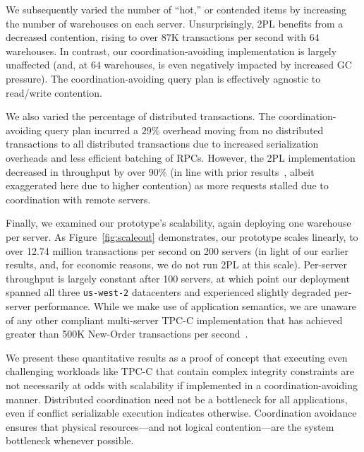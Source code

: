  We subsequently varied the number of
``hot,'' or contended items by increasing the number of warehouses on
each server. Unsurprisingly, 2PL benefits from a decreased
contention, rising to over $87$K transactions per second with $64$
warehouses. In contrast, our coordination-avoiding implementation is
largely unaffected (and, at $64$ warehouses, is even negatively
impacted by increased GC pressure). The coordination-avoiding query
plan is effectively agnostic to read/write contention.

 We also varied the percentage of
distributed transactions. The coordination-avoiding query plan
incurred a $29\%$ overhead moving from no distributed transactions to
all distributed transactions due to increased serialization overheads
and less efficient batching of RPCs. However, the 2PL implementation decreased in throughput by over $90\%$ (in line
with prior results~\cite{abadi-vll,calvin}, albeit exaggerated here
due to higher contention) as more requests stalled due to coordination
with remote servers.

 Finally, we examined our prototype's scalability,
again deploying one warehouse per server. As Figure~\ref{fig:scaleout}
demonstrates, our prototype scales linearly, to over 12.74 million
transactions per second on 200 servers (in light of our earlier
results, and, for economic reasons, we do not run 2PL at this
scale). Per-server throughput is largely constant after 100 servers,
at which point our deployment spanned all three \texttt{us-west-2}
datacenters and experienced slightly degraded per-server performance.
While we make use of application semantics, we are unaware of
any other compliant multi-server TPC-C implementation that has
achieved greater than 500K New-Order transactions per
second~\cite{calvin,jones-dtxn,hstore,abadi-vll}.

 We present these quantitative results as a proof of
concept that executing even challenging workloads like TPC-C that
contain complex integrity constraints are not necessarily at odds with
scalability if implemented in a coordination-avoiding
manner. Distributed coordination need not be a bottleneck for all
applications, even if conflict serializable execution indicates
otherwise. Coordination avoidance ensures that physical
resources---and not logical contention---are the system bottleneck
whenever possible.

